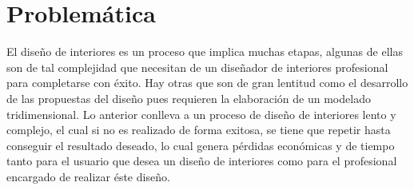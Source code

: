 \newpage
\section{Problemática}
El diseño de interiores es un proceso que implica muchas etapas, algunas de ellas son de tal complejidad que necesitan de un diseñador de interiores profesional para completarse con éxito. Hay otras que son de gran lentitud como el desarrollo de las propuestas del diseño pues requieren la elaboración de un modelado tridimensional. Lo anterior conlleva a un proceso de diseño de interiores lento y complejo, el cual si no es realizado de forma exitosa, se tiene que repetir hasta conseguir el resultado deseado, lo cual genera pérdidas económicas y de tiempo tanto para el usuario que desea un diseño de interiores como para el profesional encargado de realizar éste diseño.

   